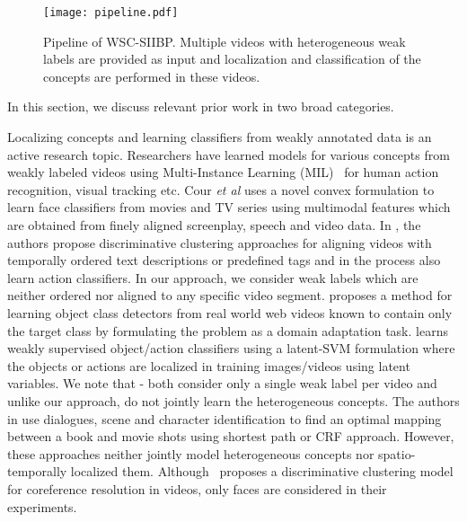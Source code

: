 \documentclass[runningheads]{llncs}
\begin{document}
\begin{figure}[!tp]
\centering
\texttt{[image: pipeline.pdf]}
\caption{Pipeline of WSC-SIIBP. Multiple videos with heterogeneous weak labels are provided as input and localization and classification of the concepts are performed in these videos.}
\label{pipeline}
\vspace{-6mm}
\end{figure}

In this section, we discuss relevant prior work in two broad categories.  

 Localizing concepts and learning classifiers from weakly annotated data is an active research topic. Researchers have learned models for various concepts from weakly labeled videos using Multi-Instance Learning (MIL)~\cite{zhang2005multiple,andrews2002support} for human action recognition\cite{ali2010human}, visual tracking \cite{babenko2009visual} etc. Cour {\it et al} \cite{Cour:eccv08} uses a novel convex formulation to learn face classifiers from movies and TV series using multimodal features which are obtained from finely aligned screenplay, speech and video data. In \cite{bojanowski2015weakly,bojanowski2014weakly}, the authors propose discriminative clustering approaches for aligning videos with temporally ordered text descriptions or predefined tags and in the process also learn action classifiers. In our approach, we consider weak labels which are neither ordered nor aligned to any specific video segment. \cite{prest2012learning} proposes a method for learning object class detectors from real world web videos known to contain only the target class by formulating the problem as a domain adaptation task. \cite{bilen2014object} learns weakly supervised object/action classifiers using a latent-SVM formulation where the objects or actions are localized in training images/videos using latent variables. We note that - both \cite{prest2012learning,bilen2014object} consider only a single weak label per video and unlike our approach, do not jointly learn the heterogeneous concepts. The authors in \cite{tapaswi2015book2movie,zhu2015aligning} use dialogues, scene and character identification to find an optimal mapping between a book and movie shots using shortest path or CRF approach. However, these approaches neither jointly model heterogeneous concepts nor spatio-temporally localized them. Although~\cite{ramanathan2014linking} proposes a discriminative clustering model for coreference resolution in videos, only faces are considered in their experiments.
\end{document}
